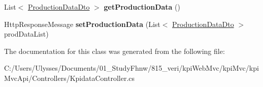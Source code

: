 \begin{DoxyCompactItemize}
\item 
\mbox{\label{classkpi_mvc_api_1_1_controllers_1_1_kpidata_controller_a0ab15672f7d3b5a077a8c4b0612feab8}} 
List$<$ \hyperlink{classkpi_mvc_api_1_1_data_transfer_objects_1_1_production_data_dto}{Production\+Data\+Dto} $>$ {\bfseries get\+Production\+Data} ()
\item 
\mbox{\label{classkpi_mvc_api_1_1_controllers_1_1_kpidata_controller_a7f6c6c359f37a9b9a83d481b5c26a037}} 
Http\+Response\+Message {\bfseries set\+Production\+Data} (List$<$ \hyperlink{classkpi_mvc_api_1_1_data_transfer_objects_1_1_production_data_dto}{Production\+Data\+Dto} $>$ prod\+Data\+List)
\end{DoxyCompactItemize}


The documentation for this class was generated from the following file\+:\begin{DoxyCompactItemize}
\item 
C\+:/\+Users/\+Ulysses/\+Documents/01\+\_\+\+Study\+Fhnw/815\+\_\+veri/kpi\+Web\+Mvc/kpi\+Mvc/kpi\+Mvc\+Api/\+Controllers/Kpidata\+Controller.\+cs\end{DoxyCompactItemize}
